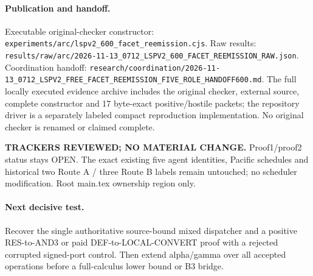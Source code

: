 \documentclass[11pt]{article}
\begin{document}
\paragraph{Publication and handoff.}
Executable original-checker constructor: \texttt{experiments/arc/lspv2\_600\_facet\_reemission.cjs}. Raw results: \texttt{results/raw/arc/2026-11-13\_0712\_LSPV2\_600\_FACET\_REEMISSION\_RAW.json}. Coordination handoff: \texttt{research/coordination/2026-11-13\_0712\_LSPV2\_FREE\_FACET\_REEMISSION\_FIVE\_ROLE\_HANDOFF600.md}. The full locally executed evidence archive includes the original checker, external source, complete constructor and 17 byte-exact positive/hostile packets; the repository driver is a separately labeled compact reproduction implementation. No original checker is renamed or claimed complete.

\textbf{TRACKERS REVIEWED; NO MATERIAL CHANGE.} Proof1/proof2 status stays OPEN. The exact existing five agent identities, Pacific schedules and historical two Route A / three Route B labels remain untouched; no scheduler modification. Root main.tex ownership region only.

\paragraph{Next decisive test.}
Recover the single authoritative source-bound mixed dispatcher and a positive RES-to-AND3 or paid DEF-to-LOCAL-CONVERT proof with a rejected corrupted signed-port control. Then extend alpha/gamma over all accepted operations before a full-calculus lower bound or B3 bridge.
\end{document}
